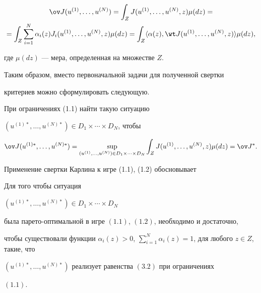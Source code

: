 \begin{multline*} 


\ov J(u^{(1)},\dotsc,u^{(N)})=\int_Z J 


(u^{(1)},\dotsc,u^{(N)},z)\mu(dz)= \\ 


=\int_Z\sum^N_{i=1}\alpha_i(z)J_i(u^{(1)},\dotsc,u^{(N)},z) 


\mu(dz)=\int_Z\la\alpha(z),\wt J(u^{(1)},\dotsc,u^{(N)},z) 


\ra\mu(dz), 


\end{multline*} 


где $\mu(dz)$ --- мера, определенная на множестве $Z$. 


Таким образом, вместо первоначальной задачи для полученной свертки 


критериев можно сформулировать следующую. 


 


При ограничениях (1.1) найти такую ситуацию 


$(u^{(1)*},\dotsc,u^{(N)*})\in D_1\times\dotsb\times D_N$, чтобы 


\begin{equation} 


\ov J(u^{(1)*},\dotsc,u^{(N)*})= 


\sup_{(u^{(1)},\dotsc,u^{(N)})\in D_1\times\dotsb\times D_N} 


\int_Z J(u^{(1)},\dotsc,u^{(N)},z)\mu(dz)=\ov J{}^*. 


\end{equation} 


 


Применение свертки Карлина к игре (1.1), (1.2) обосновывает 


 


\begin{thms} 


Для того чтобы ситуация 


$(u^{(1)*},\dotsc,u^{(N)*})\in D_1\times\dotsb\times D_N$ 


была парето-оптимальной в игре $(1.1)$, $(1.2)$, необходимо и достаточно, 


чтобы существовали функции $\alpha_i(z)>0$, $\sum\limits^N_{i=1} 


\alpha_i(z)=1$, для любого $z\in Z$, такие, что 


$(u^{(1)*},\dotsc,u^{(N)*})$ реализует равенства $(3.2)$ при ограничениях 


$(1.1)$. 


\end{thms} 


